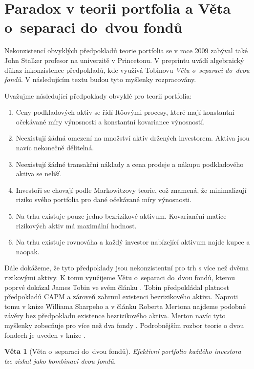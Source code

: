 \documentclass[a4paper,12pt]{report}
\newtheorem{veta}{Věta}
\theoremstyle{definition} \newtheorem{definice}[veta]{Definice}
\theoremstyle{remark}
\begin{document}

\section{Paradox v teorii portfolia a Věta o~separaci do~dvou fondů} \label{john}
Nekonzistencí obvyklých předpokladů teorie portfolia se v roce 2009 zabýval také John Stalker profesor na univerzitě v Princetonu. 
V preprintu \cite{john} uvádí algebraický důkaz inkonzistence předpokladů, kde využívá Tobinovu \textit{Větu o~separaci do~dvou fondů}. 
V následujícím textu budou tyto myšlenky rozpracovány.

Uvažujme následující předpoklady obvyklé pro teorii portfolia:
\begin{enumerate}
\item \label{predpoklad_konstantnosti_vynosu_a_rizika} Ceny podkladových aktiv se řídí It\^oovými procesy, které mají konstantní očekávané míry výnosnosti a konstantní kovariance výnosností. 
\item Neexistují žádná omezení na množství aktiv držených investorem. Aktiva jsou navíc nekonečně dělitelná.
\item Neexistují žádné transakční náklady a cena prodeje a nákupu podkladového aktiva se neliší.
\item Investoři se chovají podle Markowitzovy teorie, což znamená, že minimalizují riziko svého portfolia pro dané očekávané míry výnosnosti.
\item \label{predpoklad_hodnost} Na trhu existuje pouze jedno bezrizikové aktivum. Kovarianční matice rizikových aktiv má maximální hodnost.
\item \label{predpoklad_konstantnosti_N} Na trhu existuje rovnováha a každý investor nabízející aktivum najde kupce a naopak.
\end{enumerate}

Dále dokážeme, že tyto předpoklady jsou nekonzistentní pro trh s více než dvěma rizikovými aktivy.
K tomu využijeme Větu o~separaci do~dvou fondů, kterou poprvé dokázal  James Tobin ve svém článku \cite{tobin}. 
Tobin předpokládal platnost předpokladů CAPM a zároveň zahrnul existenci bezrizikového aktiva.
Naproti tomu v knize Williama Sharpeho \cite{sharpe} a v článku Roberta Mertona \cite{merton} najdeme podobné závěry bez předpokladu existence bezrizikového aktiva.
Merton navíc tyto myšlenky zobecňuje pro více než dva fondy \cite{merton1973}.
Podrobnějším rozbor teorie o dvou fondech je uveden v knize \cite{cass1970structure}.
\begin{veta}[Věta o~separaci do~dvou fondů]
Efektivní portfolio každého investora lze získat jako kombinaci dvou fondů.
\end{veta}
\end{document}

